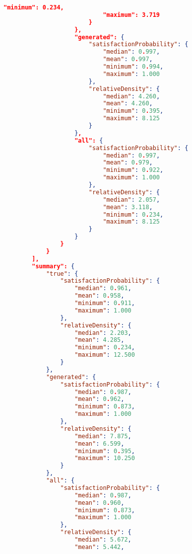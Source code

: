 \documentclass[../main.tex]{subfiles}
\begin{document}
\begin{lstlisting}[language=json,firstnumber=1,caption={The output of a typical experiment, automatically logged when the experiment concludes.},captionpos=b]
                            "minimum": 0.234,
                            "maximum": 3.719
                        }
                    },
                    "generated": {  
                        "satisfactionProbability": {  
                            "median": 0.997,
                            "mean": 0.997,
                            "minimum": 0.994,
                            "maximum": 1.000
                        },
                        "relativeDensity": {  
                            "median": 4.260,
                            "mean": 4.260,
                            "minimum": 0.395,
                            "maximum": 8.125
                        }
                    },
                    "all": {  
                        "satisfactionProbability": {  
                            "median": 0.997,
                            "mean": 0.979,
                            "minimum": 0.922,
                            "maximum": 1.000
                        },
                        "relativeDensity": {  
                            "median": 2.057,
                            "mean": 3.118,
                            "minimum": 0.234,
                            "maximum": 8.125
                        }
                    }
                }
            }
        ],
        "summary": {  
            "true": {  
                "satisfactionProbability": {  
                    "median": 0.961,
                    "mean": 0.958,
                    "minimum": 0.911,
                    "maximum": 1.000
                },
                "relativeDensity": {  
                    "median": 2.203,
                    "mean": 4.285,
                    "minimum": 0.234,
                    "maximum": 12.500
                }
            },
            "generated": {  
                "satisfactionProbability": {  
                    "median": 0.987,
                    "mean": 0.962,
                    "minimum": 0.873,
                    "maximum": 1.000
                },
                "relativeDensity": {  
                    "median": 7.875,
                    "mean": 6.599,
                    "minimum": 0.395,
                    "maximum": 10.250
                }
            },
            "all": {  
                "satisfactionProbability": {  
                    "median": 0.987,
                    "mean": 0.960,
                    "minimum": 0.873,
                    "maximum": 1.000
                },
                "relativeDensity": {  
                    "median": 5.672,
                    "mean": 5.442,

\end{lstlisting}
\end{document}
